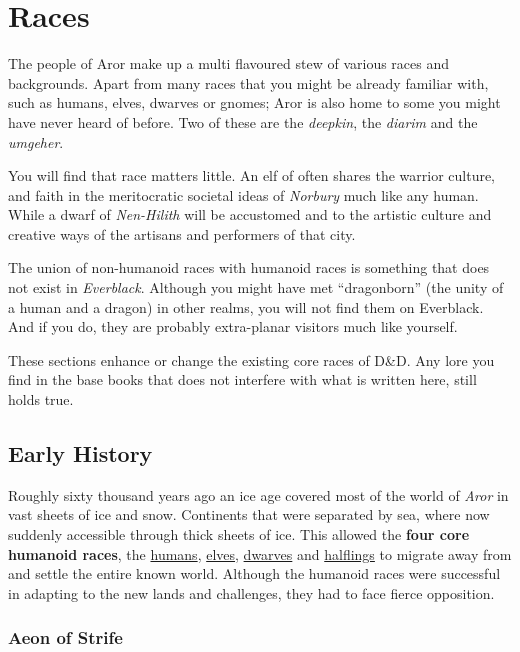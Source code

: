 \twocolumn
\section{Races}

The people of Aror make up a multi flavoured stew of various races and
backgrounds. Apart from many races that you might be already familiar with,
such as humans, elves, dwarves or gnomes; Aror is also home to some you might
have never heard of before. Two of these are the \emph{deepkin}, the
\emph{diarim} and the \emph{umgeher}.

You will find that race matters little. An elf of  often
shares the warrior culture, and faith in the meritocratic societal ideas
of \emph{Norbury} much like any human. While a dwarf of \emph{Nen-Hilith} will
be accustomed and to the artistic culture and creative ways of the artisans
and performers of that city.

The union of non-humanoid races with humanoid races is something that does
not exist in \emph{Everblack}. Although you might have met ``dragonborn''
(the unity of a human and a dragon) in other realms, you will not find them
on Everblack. And if you do, they are probably extra-planar visitors much
like yourself.

\begin{note}
These sections enhance or change the existing core races of D\&D. Any lore you
find in the base books that does not interfere with what is written here, still
holds true.
\end{note}

\subsection{Early History}

Roughly sixty thousand years ago an ice age covered most of the world
of \emph{Aror} in vast sheets of ice and snow. Continents that were separated
by sea, where now suddenly accessible through thick sheets of ice. This
allowed the \textbf{four core humanoid races}, the
\hyperref[sec:Humans]{humans}, \hyperref[sec:Elves]{elves},
\hyperref[sec:Dwarves]{dwarves} and \hyperref[sec:Halflings]{halflings}
to migrate away from  and settle the entire known
world. Although the humanoid races were successful in adapting to the new
lands and challenges, they had to face fierce opposition.

\subsubsection{Aeon of Strife}
\label{sec:Aeon of Strife}

